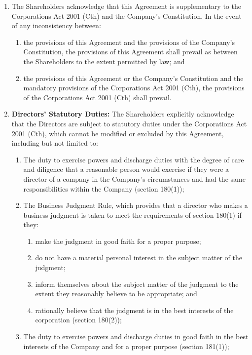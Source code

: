 \begin{enumerate}[label=(\alph*)]
\item The Shareholders acknowledge that this Agreement is supplementary to the Corporations Act 2001 (Cth) and the Company's Constitution. In the event of any inconsistency between:
    \begin{enumerate}[label=(\roman*)]
    \item the provisions of this Agreement and the provisions of the Company's Constitution, the provisions of this Agreement shall prevail as between the Shareholders to the extent permitted by law; and
    \item the provisions of this Agreement or the Company's Constitution and the mandatory provisions of the Corporations Act 2001 (Cth), the provisions of the Corporations Act 2001 (Cth) shall prevail.
    \end{enumerate}
\item \textbf{Directors' Statutory Duties:} The Shareholders explicitly acknowledge that the Directors are subject to statutory duties under the Corporations Act 2001 (Cth), which cannot be modified or excluded by this Agreement, including but not limited to:
    \begin{enumerate}[label=(\roman*)]
    \item The duty to exercise powers and discharge duties with the degree of care and diligence that a reasonable person would exercise if they were a director of a company in the Company's circumstances and had the same responsibilities within the Company (section 180(1));
    \item The Business Judgment Rule, which provides that a director who makes a business judgment is taken to meet the requirements of section 180(1) if they:
        \begin{enumerate}[label=(\alph*)]
        \item make the judgment in good faith for a proper purpose;
        \item do not have a material personal interest in the subject matter of the judgment;
        \item inform themselves about the subject matter of the judgment to the extent they reasonably believe to be appropriate; and
        \item rationally believe that the judgment is in the best interests of the corporation (section 180(2));
        \end{enumerate}
    \item The duty to exercise powers and discharge duties in good faith in the best interests of the Company and for a proper purpose (section 181(1));

\end{enumerate}
\end{enumerate}

